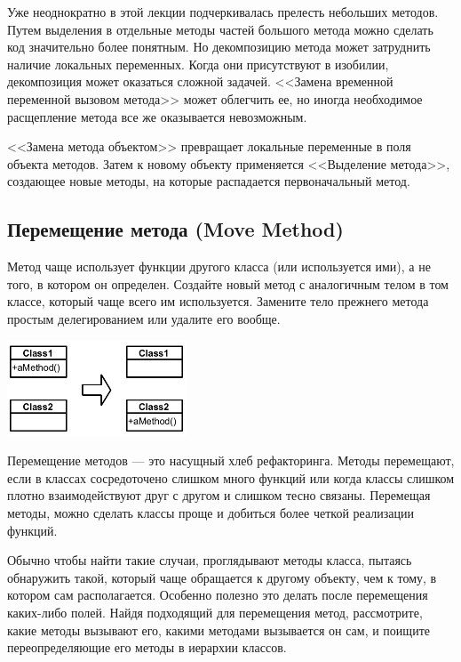 \documentclass{../../text-style}
\begin{document}
Уже неоднократно в этой лекции подчеркивалась прелесть небольших методов. Путем выделения в отдельные методы частей большого метода можно сделать код значительно более понятным. Но декомпозицию метода может затруднить наличие локальных переменных. Когда они присутствуют в изобилии, декомпозиция может оказаться сложной задачей. <<Замена временной переменной вызовом метода>> может облегчить ее, но иногда необходимое расщепление метода все же оказывается невозможным.

<<Замена метода объектом>> превращает локальные переменные в поля объекта методов. Затем к новому объекту применяется <<Выделение метода>>, создающее новые методы, на которые распадается первоначальный метод.

\subsection{Перемещение метода (Move Method)}

Метод чаще использует функции другого класса (или используется ими), а не того, в котором он определен. Создайте новый метод с аналогичным телом в том классе, который чаще всего им используется. Замените тело прежнего метода простым делегированием или удалите его вообще.

\begin{center}
    \includegraphics[width=0.4\textwidth]{moveMethod.png}
\end{center}

Перемещение методов --- это насущный хлеб рефакторинга. Методы перемещают, если в классах сосредоточено слишком много функций или когда классы слишком плотно взаимодействуют друг с другом и слишком тесно связаны. Перемещая методы, можно сделать классы проще и добиться более четкой реализации функций. 

Обычно чтобы найти такие случаи, проглядывают методы класса, пытаясь обнаружить такой, который чаще обращается к другому объекту, чем к тому, в котором сам располагается. Особенно полезно это делать после перемещения каких-либо полей. Найдя подходящий для перемещения метод, рассмотрите, какие методы вызывают его, какими методами вызывается он сам, и поищите переопределяющие его методы в иерархии классов. 
\end{document}
